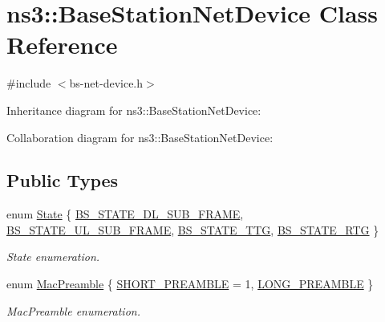 \hypertarget{classns3_1_1BaseStationNetDevice}{}\section{ns3\+:\+:Base\+Station\+Net\+Device Class Reference}
\label{classns3_1_1BaseStationNetDevice}


{\ttfamily \#include $<$bs-\/net-\/device.\+h$>$}



Inheritance diagram for ns3\+:\+:Base\+Station\+Net\+Device\+:


Collaboration diagram for ns3\+:\+:Base\+Station\+Net\+Device\+:
\subsection*{Public Types}
\begin{DoxyCompactItemize}
\item 
enum \hyperlink{classns3_1_1BaseStationNetDevice_a70b3d78837bcc09df385146fb7f51498}{State} \{ \hyperlink{classns3_1_1BaseStationNetDevice_a70b3d78837bcc09df385146fb7f51498a452d6ef98b926c1b244b01730ce44391}{B\+S\+\_\+\+S\+T\+A\+T\+E\+\_\+\+D\+L\+\_\+\+S\+U\+B\+\_\+\+F\+R\+A\+ME}, 
\hyperlink{classns3_1_1BaseStationNetDevice_a70b3d78837bcc09df385146fb7f51498aea64791fa58c182a50bf32da2b0a6f52}{B\+S\+\_\+\+S\+T\+A\+T\+E\+\_\+\+U\+L\+\_\+\+S\+U\+B\+\_\+\+F\+R\+A\+ME}, 
\hyperlink{classns3_1_1BaseStationNetDevice_a70b3d78837bcc09df385146fb7f51498aeccaf118148a1c72ddfa5bec02b30ef6}{B\+S\+\_\+\+S\+T\+A\+T\+E\+\_\+\+T\+TG}, 
\hyperlink{classns3_1_1BaseStationNetDevice_a70b3d78837bcc09df385146fb7f51498a49e8db30dcf37738c5149f670c282fdc}{B\+S\+\_\+\+S\+T\+A\+T\+E\+\_\+\+R\+TG}
 \}\begin{DoxyCompactList}\small\item\em State enumeration. \end{DoxyCompactList}
\item 
enum \hyperlink{classns3_1_1BaseStationNetDevice_a1043912af2173c4026f8d3f5dc87df3b}{Mac\+Preamble} \{ \hyperlink{classns3_1_1BaseStationNetDevice_a1043912af2173c4026f8d3f5dc87df3ba27b7531027ce0fc60de828ea6bca0656}{S\+H\+O\+R\+T\+\_\+\+P\+R\+E\+A\+M\+B\+LE} = 1, 
\hyperlink{classns3_1_1BaseStationNetDevice_a1043912af2173c4026f8d3f5dc87df3ba3abacb73f82dd84559872b7bba69e15d}{L\+O\+N\+G\+\_\+\+P\+R\+E\+A\+M\+B\+LE}
 \}\begin{DoxyCompactList}\small\item\em Mac\+Preamble enumeration. \end{DoxyCompactList}
\end{DoxyCompactItemize}
